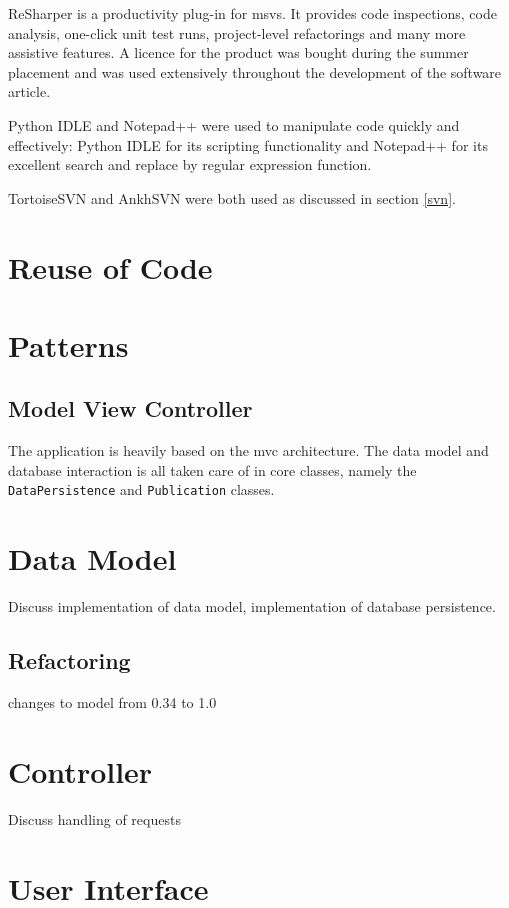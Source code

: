 \documentclass{l4proj}
\begin{document}
ReSharper is a productivity plug-in for \gls{msvs}.  It provides code inspections, code analysis, one-click unit test runs, project-level refactorings and many more assistive features. A licence for the product was bought during the summer placement and was used extensively throughout the development of the software article.

Python IDLE and Notepad++ were used to manipulate code quickly and effectively: Python IDLE for its scripting functionality and Notepad++ for its excellent search and replace by regular expression function.

TortoiseSVN and AnkhSVN were both used as discussed in section \ref{svn}.

\section{Reuse of Code}



\section{Patterns}

\subsection{Model View Controller}
The application is heavily based on the \gls{mvc} architecture.  The data model and database interaction is all taken care of in core classes, namely the \texttt{DataPersistence} and \texttt{Publication} classes.



\section{Data Model}
Discuss implementation of data model, implementation of database persistence.

\subsection{Refactoring}
changes to model from 0.34 to 1.0

\section{Controller}
Discuss handling of requests

\section{User Interface}
\end{document}
